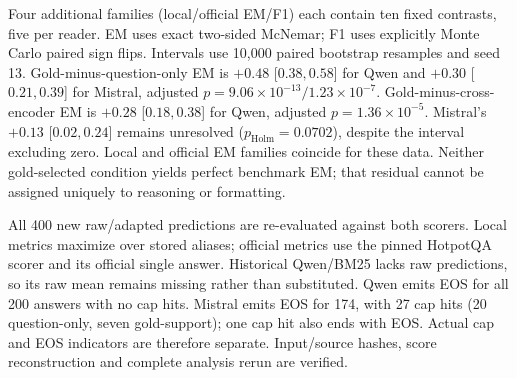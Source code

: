 Four additional families (local/official EM/F1) each contain ten fixed contrasts, five per reader. EM uses exact two-sided McNemar; F1 uses explicitly Monte Carlo paired sign flips. Intervals use 10,000 paired bootstrap resamples and seed 13. Gold-minus-question-only EM is $+0.48$ [$0.38,0.58$] for Qwen and $+0.30$ [$0.21,0.39$] for Mistral, adjusted $p=9.06\times10^{-13}/1.23\times10^{-7}$. Gold-minus-cross-encoder EM is $+0.28$ [$0.18,0.38$] for Qwen, adjusted $p=1.36\times10^{-5}$. Mistral's $+0.13$ [$0.02,0.24$] remains unresolved ($p_{\mathrm{Holm}}=0.0702$), despite the interval excluding zero. Local and official EM families coincide for these data. Neither gold-selected condition yields perfect benchmark EM; that residual cannot be assigned uniquely to reasoning or formatting.

All 400 new raw/adapted predictions are re-evaluated against both scorers. Local metrics maximize over stored aliases; official metrics use the pinned HotpotQA scorer and its official single answer. Historical Qwen/BM25 lacks raw predictions, so its raw mean remains missing rather than substituted. Qwen emits EOS for all 200 answers with no cap hits. Mistral emits EOS for 174, with 27 cap hits (20 question-only, seven gold-support); one cap hit also ends with EOS. Actual cap and EOS indicators are therefore separate. Input/source hashes, score reconstruction and complete analysis rerun are verified.

\FloatBarrier
